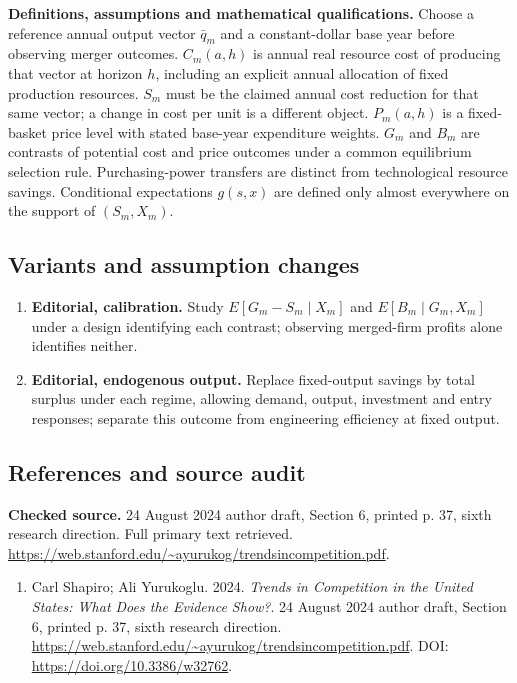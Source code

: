 \documentclass[11pt,a4paper]{article}
\begin{document}
\textbf{Definitions, assumptions and mathematical qualifications.} Choose a reference annual output vector \(\bar q_m\) and a constant-dollar base year before observing merger outcomes. \(C_m(a,h)\) is annual real resource cost of producing that vector at horizon \(h\), including an explicit annual allocation of fixed production resources. \(S_m\) must be the claimed annual cost reduction for that same vector; a change in cost per unit is a different object. \(P_m(a,h)\) is a fixed-basket price level with stated base-year expenditure weights. \(G_m\) and \(B_m\) are contrasts of potential cost and price outcomes under a common equilibrium selection rule. Purchasing-power transfers are distinct from technological resource savings. Conditional expectations \(g(s,x)\) are defined only almost everywhere on the support of \((S_m,X_m)\).
\subsection*{Variants and assumption changes}
\begin{enumerate}
\item \textbf{Editorial, calibration.} Study \(E[G_m-S_m\mid X_m]\) and \(E[B_m\mid G_m,X_m]\) under a design identifying each contrast; observing merged-firm profits alone identifies neither.
\item \textbf{Editorial, endogenous output.} Replace fixed-output savings by total surplus under each regime, allowing demand, output, investment and entry responses; separate this outcome from engineering efficiency at fixed output.
\end{enumerate}
\subsection*{References and source audit}
\textbf{Checked source.} 24 August 2024 author draft, Section 6, printed p. 37, sixth research direction. Full primary text retrieved. \url{https://web.stanford.edu/~ayurukog/trendsincompetition.pdf}.
\begin{enumerate}\raggedright
\item\hypertarget{definitions:source:30007676:1}{} Carl Shapiro; Ali Yurukoglu. 2024. \emph{Trends in Competition in the United States: What Does the Evidence Show?}. 24 August 2024 author draft, Section 6, printed p. 37, sixth research direction.
\url{https://web.stanford.edu/~ayurukog/trendsincompetition.pdf}.
DOI: \url{https://doi.org/10.3386/w32762}.
\end{enumerate}
\end{document}

